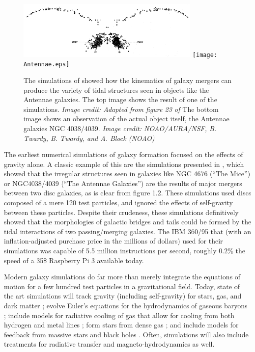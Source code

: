 \begin{figure}
    \includegraphics[width=0.8\textwidth]{Toomre.eps}
    \texttt{[image: Antennae.eps]}
    \caption[Early simulation of Antennae Galaxies]{The simulations of
    \citet{Toomre1972} showed how the kinematics of galaxy mergers can produce
    the variety of tidal structures seen in objects like the Antennae galaxies.
    The top image shows the result of one of the \citet{Toomre1972} simulations.
    \textit{Image credit: Adapted from figure 23 of \citet{Toomre1972}}
    The bottom image shows an observation of the actual object itself, the
    Antennae galaxies NGC 4038/4039. \textit{Image credit: NOAO/AURA/NSF, B.
    Twardy, B. Twardy, and A. Block (NOAO)}}
\end{figure}

The earliest numerical simulations of galaxy formation focused on the effects of
gravity alone.  A classic example of this are the simulations presented in
\citet{Toomre1972}, which showed that the irregular structures seen in galaxies
like NGC 4676 (``The Mice'') or NGC4038/4039 (``The Antennae Galaxies'') are the
results of major mergers between two disc galaxies, as is clear from figure 1.2.
These simulations used discs composed of a mere 120 test particles, and ignored
the effects of self-gravity between these particles.  Despite their crudeness,
these simulations definitively showed that the morphologies of galactic bridges and tails could be
formed by the tidal interactions of two passing/merging galaxies.  The IBM
360/95 that \citet{Toomre1972} (with an inflation-adjusted purchase price in the
millions of dollars) used for their simulations was capable of 5.5 million
instructions per second, roughly $0.2\%$ the speed of a 35\$ Raspberry Pi 3
available today.

Modern galaxy simulations do far more than merely integrate the equations of
motion for a few hundred test particles in a gravitational field.  Today, state
of the art simulations will track gravity (including self-gravity) for stars,
gas, and dark matter \citep{Aarseth1980,Stadel2001,Dehnen2002}; evolve Euler's
equations for the hydrodynamics of gaseous baryons
\citep{Wadsley2004,Teyssier2002,Bryan2014}; include models for radiative
cooling of gas that allow for cooling from both hydrogen and metal lines
\citep{Marri2003,Shen2010}; form stars from dense gas
\citep{Katz1992,Agertz2015}; and include models for feedback from massive stars
and black holes \citep{Katz1992,Springel2003,DiMatteo2005}.  Often, simulations
will also include treatments for radiative transfer
\citep{Gendelev2012,Krumholz2013} and magneto-hydrodynamics
\citep{Girichidis2015} as well.


